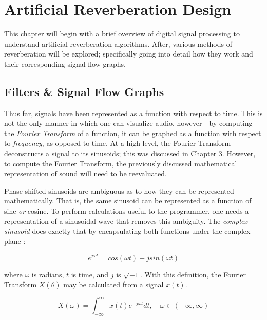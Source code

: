 \chapter{Artificial Reverberation Design}
\hspace*{-0.15cm}This chapter will begin with a brief overview of digital signal processing to understand artificial reverberation algorithms. After, various methods of reverberation will be explored; specifically going into detail how they work and their corresponding signal flow graphs.

\section{Filters \& Signal Flow Graphs}
Thus far, signals have been represented as a function with respect to time. This is not the only manner in which one can visualize audio, however - by computing the \textit{Fourier Transform} of a function, it can be graphed as a function with respect to \textit{frequency}, as opposed to time. At a high level, the Fourier Transform deconstructs a signal to its sinusoids; this was discussed in Chapter 3. However, to compute the Fourier Transform, the previously discussed mathematical representation of sound will need to be reevaluated.

Phase shifted sinusoids are ambiguous as to how they can be represented mathematically. That is, the same sinusoid can be represented as a function of sine \textit{or} cosine. To perform calculations useful to the programmer, one needs a representation of a sinusoidal wave that removes this ambiguity. The \textit{complex sinusoid} does exactly that by encapsulating both functions under the complex plane \cite{pirkle2019designing}:

\begin{defn}\label{def-complex}
	\begin{equation}\label{eq-complex)}
	e^{j\omega t} = cos(\omega t) + j sin(\omega t)
\end{equation}\end{defn}

where $\omega$ is radians, $t$ is time, and $j$ is $ \sqrt{-1}$. With this definition, the Fourier Transform $X(\theta)$ may be calculated from a signal $x(t)$.

\begin{defn}\label{def-Cont-FT}
	\begin{equation}\label{eq-Cont-FT)}
	X(\omega) = \int_{-\infty}^\infty x(t)e^{-j\omega t}dt, \quad \omega \in (-\infty, \infty)
\end{equation}\end{defn}

